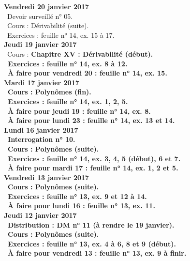 \documentclass[12pt,a4paper]{article}
\begin{document}
\noindent\textbf{Vendredi 20 janvier 2017}\\
\bu\ Devoir surveillé n° 05.\\
\bu\ Cours : Dérivabilité (suite).\\
\bu\ Exercices : feuille n° 14, ex. 15 à 17.\vspace{.4cm}\\

\noindent\textbf{Jeudi 19 janvier 2017}\\
\bu\ Cours : \bf Chapitre XV \rm : Dérivabilité (début).\\
\bu\ Exercices : feuille n° 14, ex. 8 à 12.\\
\bu\ À faire pour vendredi 20 : feuille n° 14, ex. 15.\vspace{.4cm}\\ 

\noindent\textbf{Mardi 17 janvier 2017}\\
\bu\ Cours : Polynômes (fin).\\
\bu\ Exercices : feuille n° 14, ex. 1, 2, 5.\\
\bu\ À faire pour jeudi 19 : feuille n° 14, ex. 8.\\  
\bu\ À faire pour lundi 23 : feuille n° 14, ex. 13 et 14.\vspace{.4cm}\\  
 
\noindent\textbf{ Lundi 16 janvier 2017}\\
\bu\ Interrogation n° 10.\\
\bu\ Cours : Polynômes (suite).\\
\bu\ Exercices : feuille n° 14, ex. 3, 4, 5 (début), 6 et 7.\\
\bu\ À faire pour mardi 17 : feuille n° 14, ex. 1, 2 et 5.\vspace{.4cm}\\  

\noindent\textbf{Vendredi 13 janvier 2017}\\
\bu\ Cours : Polynômes (suite).\\
\bu\ Exercices : feuille n° 13, ex. 9 et 12 à 14.\\
\bu\ À faire pour lundi 16 : feuille n° 13, ex. 11.\vspace{.4cm}\\

\noindent\textbf{Jeudi 12 janvier 2017}\\
\bu\ Distribution : DM n° 11 (à rendre le 19 janvier).\\
\bu\ Cours : Polynômes (suite).\\
\bu\ Exercices : feuille n° 13, ex. 4 à 6, 8 et 9 (début).\\
\bu\ À faire pour vendredi 13 : feuille n° 13, ex. 9 à finir.\vspace{.4cm}\\
\end{document}
